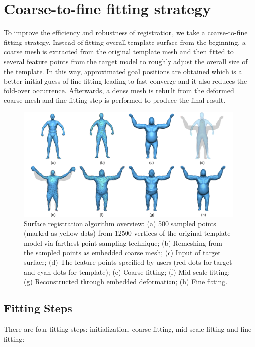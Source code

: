 \section{Coarse-to-fine fitting strategy}
To improve the efficiency and robustness of registration, we take a coarse-to-fine fitting strategy. Instead of fitting overall template surface from the beginning, a coarse mesh is extracted from the original template mesh and then fitted to several feature points from the target model to roughly adjust the overall size of the template. In this way, approximated goal positions are obtained which is a better initial guess of fine fitting leading to fast converge and it also reduces the fold-over occurrence. Afterwards, a dense mesh is rebuilt from the deformed coarse mesh and fine fitting step is performed to produce the final result.
 \begin{figure}[!hptb]
 \centering

 \captionsetup[subfigure]{labelformat=empty}
 \centering

			\includegraphics[width=\textwidth]{./figure/overview.png}


     \caption{Surface registration algorithm overview: (a) 500 sampled points (marked as yellow dots) from 12500 vertices of the original template model via farthest point sampling technique; (b) Remeshing from the sampled points as embedded coarse mesh; (c) Input of target surface; (d) The feature points specified by users (red dots for target and cyan dots for template); (e) Coarse fitting; (f) Mid-scale fitting; (g) Reconstructed through embedded deformation; (h) Fine fitting.}
     \label{fig:overview}
 \end{figure}
\subsection{Fitting Steps}
There are four fitting steps: initialization, coarse fitting, mid-scale fitting and fine fitting:\\

